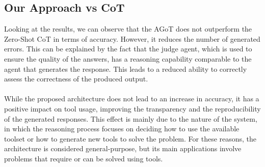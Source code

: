 \documentclass[12pt,a4paper,openright,twoside]{book}
\begin{document}
\subsection{Our Approach vs CoT}
Looking at the results, we can observe that the \ac{AGoT} does not outperform the Zero-Shot \ac{CoT} in terms of accuracy. However, it reduces the number of generated errors.
This can be explained by the fact that the judge agent, which is used to ensure the quality of the answers, has a reasoning capability comparable to the agent that generates the response.
This leads to a reduced ability to correctly assess the correctness of the produced output.
\\\\
While the proposed architecture does not lead to an increase in accuracy, it has a positive impact on tool usage, improving the transparency and the reproducibility of the generated responses. 
This effect is mainly due to the nature of the system, in which the reasoning process focuses on deciding how to use the available toolset or how to generate new tools to solve the problem.
For these reasons, the architecture is considered general-purpose, but its main applications involve problems that require or can be solved using tools.
\end{document}
